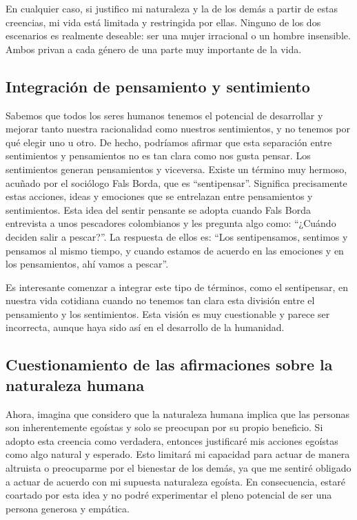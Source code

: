 \documentclass[
  jou,
  floatsintext,
  longtable,
  a4paper,
  nolmodern,
  notxfonts,
  notimes,
  12pt,
  colorlinks=true,linkcolor=blue,citecolor=blue,urlcolor=blue]{apa7}
\begin{document}
En cualquier caso, si justifico mi naturaleza y la de los demás a partir
de estas creencias, mi vida está limitada y restringida por ellas.
Ninguno de los dos escenarios es realmente deseable: ser una mujer
irracional o un hombre insensible. Ambos privan a cada género de una
parte muy importante de la vida.

\subsection{Integración de pensamiento y
sentimiento}\label{integraciuxf3n-de-pensamiento-y-sentimiento}

Sabemos que todos los seres humanos tenemos el potencial de desarrollar
y mejorar tanto nuestra racionalidad como nuestros sentimientos, y no
tenemos por qué elegir uno u otro. De hecho, podríamos afirmar que esta
separación entre sentimientos y pensamientos no es tan clara como nos
gusta pensar. Los sentimientos generan pensamientos y viceversa. Existe
un término muy hermoso, acuñado por el sociólogo Fals Borda, que es
``sentipensar''. Significa precisamente estas acciones, ideas y
emociones que se entrelazan entre pensamientos y sentimientos. Esta idea
del sentir pensante se adopta cuando Fals Borda entrevista a unos
pescadores colombianos y les pregunta algo como: ``¿Cuándo deciden salir
a pescar?''. La respuesta de ellos es: ``Los sentipensamos, sentimos y
pensamos al mismo tiempo, y cuando estamos de acuerdo en las emociones y
en los pensamientos, ahí vamos a pescar''.

Es interesante comenzar a integrar este tipo de términos, como el
sentipensar, en nuestra vida cotidiana cuando no tenemos tan clara esta
división entre el pensamiento y los sentimientos. Esta visión es muy
cuestionable y parece ser incorrecta, aunque haya sido así en el
desarrollo de la humanidad.

\subsection{Cuestionamiento de las afirmaciones sobre la naturaleza
humana}\label{cuestionamiento-de-las-afirmaciones-sobre-la-naturaleza-humana}

Ahora, imagina que considero que la naturaleza humana implica que las
personas son inherentemente egoístas y solo se preocupan por su propio
beneficio. Si adopto esta creencia como verdadera, entonces justificaré
mis acciones egoístas como algo natural y esperado. Esto limitará mi
capacidad para actuar de manera altruista o preocuparme por el bienestar
de los demás, ya que me sentiré obligado a actuar de acuerdo con mi
supuesta naturaleza egoísta. En consecuencia, estaré coartado por esta
idea y no podré experimentar el pleno potencial de ser una persona
generosa y empática.
\end{document}
